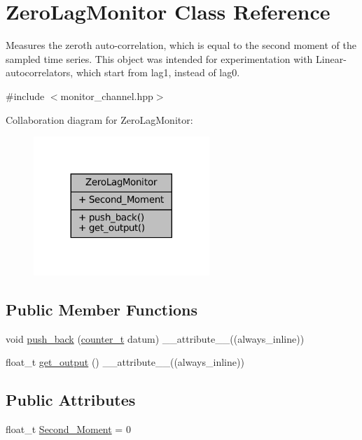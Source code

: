 \hypertarget{classZeroLagMonitor}{}\section{Zero\+Lag\+Monitor Class Reference}
\label{classZeroLagMonitor}


Measures the zeroth auto-\/correlation, which is equal to the second moment of the sampled time series. This object was intended for experimentation with Linear-\/autocorrelators, which start from lag1, instead of lag0.  




{\ttfamily \#include $<$monitor\+\_\+channel.\+hpp$>$}



Collaboration diagram for Zero\+Lag\+Monitor\+:\nopagebreak
\begin{figure}[H]
\begin{center}
\leavevmode
\includegraphics[width=188pt]{df/d5e/classZeroLagMonitor__coll__graph}
\end{center}
\end{figure}
\subsection*{Public Member Functions}
\begin{DoxyCompactItemize}
\item 
void \hyperlink{classZeroLagMonitor_a22be76548cef864fba0a9c9125a57cce}{push\+\_\+back} (\hyperlink{types_8hpp_a22f279793847eba127de149437848c48}{counter\+\_\+t} datum) \+\_\+\+\_\+attribute\+\_\+\+\_\+((always\+\_\+inline))
\item 
float\+\_\+t \hyperlink{classZeroLagMonitor_ae55b5b21f78fd93d1c8afc95bba69ba4}{get\+\_\+output} () \+\_\+\+\_\+attribute\+\_\+\+\_\+((always\+\_\+inline))
\end{DoxyCompactItemize}
\subsection*{Public Attributes}
\begin{DoxyCompactItemize}
\item 
float\+\_\+t \hyperlink{classZeroLagMonitor_ad155a1aa85eba7a03b65c15649228006}{Second\+\_\+\+Moment} = 0
\end{DoxyCompactItemize}


